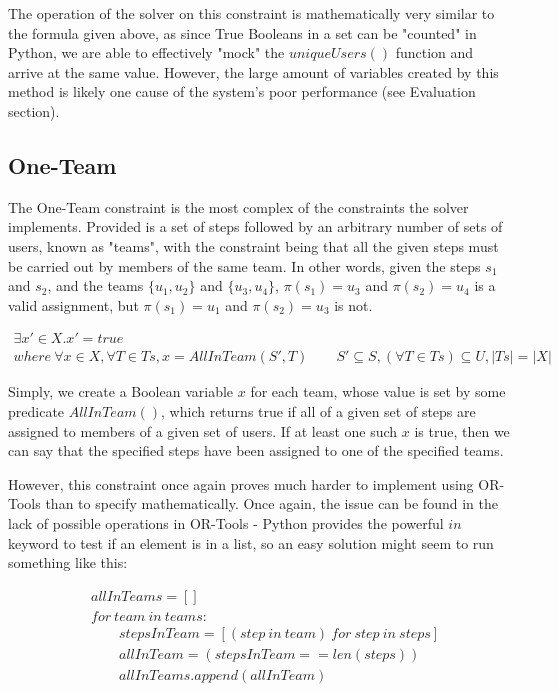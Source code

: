 \documentclass[11pt]{article}
\begin{document}
			The operation of the solver on this constraint is mathematically very similar to the formula given above,
			as since True Booleans in a set can be "counted" in Python,
			we are able to effectively "mock" the \(uniqueUsers()\) function and arrive at the same value.
			However, the large amount of variables created by this method is likely one cause of the system's poor performance (see Evaluation section).

		\subsection{One-Team}

			The One-Team constraint is the most complex of the constraints the solver implements.
			Provided is a set of steps followed by an arbitrary number of sets of users,
			known as "teams", with the constraint being that all the given steps must be carried out
			by members of the same team. In other words, given the steps \(s_1\) and \(s_2\),
			and the teams \(\{u_1, u_2\}\) and \(\{u_3, u_4\}\),
			\(\pi(s_1) = u_3\) and \(\pi(s_2) = u_4\) is a valid assignment, but \(\pi(s_1) = u_1\) and \(\pi(s_2) = u_3\) is not.

			\begin{multline}
				\exists x' \in X . x' = true \\ where \ \forall x \in X, \forall T \in Ts, x = AllInTeam(S', T) \qquad S' \subseteq S, (\forall T \in Ts) \subseteq U, |Ts| = |X|
			\end{multline}

			Simply, we create a Boolean variable \(x\) for each team, whose value is set by some predicate \(AllInTeam()\),
			which returns true if all of a given set of steps are assigned to members of a given set of users.
			If at least one such \(x\) is true, then we can say that the specified steps have been assigned to one of the specified teams.

			However, this constraint once again proves much harder to implement using OR-Tools than to specify mathematically.
			Once again, the issue can be found in the lack of possible operations in OR-Tools -
			Python provides the powerful \(in\) keyword to test if an element is in a list,
			so an easy solution might seem to run something like this:

			\begin{align*}
				&allInTeams = [] \\
				&for \ team \ in \ teams:\\
				&\qquad stepsInTeam = [(step \ in \ team) \ for \ step \ in \ steps]\\
				&\qquad allInTeam = (stepsInTeam == len(steps))\\
				&\qquad allInTeams.append(allInTeam)
			\end{align*}
\end{document}

